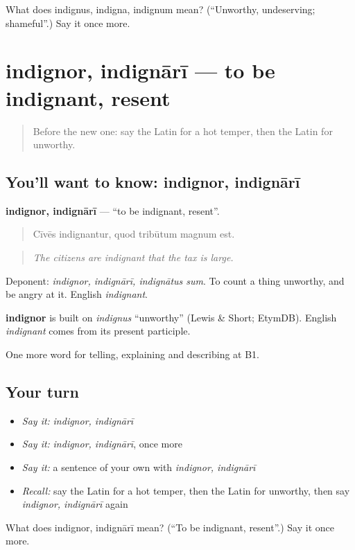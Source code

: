 \begin{tcolorbox}[breakable,colback=teal!4,colframe=teal!35!black,title={Before you move on}]
What does indignus, indigna, indignum mean? (\textquotedblleft{}Unworthy, undeserving; shameful\textquotedblright{}.) Say it once more.
\end{tcolorbox}
\section[indignor, indignārī]{indignor, indignārī — to be indignant, resent}

\label{lesson:LA-C493-indignor}



\begin{quote}
Before the new one: say the Latin for a hot temper, then the Latin for unworthy.
\end{quote}

\subsection*{You'll want to know: indignor, indignārī}
\textbf{indignor, indignārī} — \textquotedblleft{}to be indignant, resent\textquotedblright{}.

\begin{quote}
Cīvēs indignantur, quod tribūtum magnum est.
\end{quote}

\begin{quote}
\emph{The citizens are indignant that the tax is large.}
\end{quote}

Deponent: \emph{indignor, indignārī, indignātus sum}. To count a thing unworthy, and be angry at it. English \emph{indignant}.

\begin{cousinweb}
\textbf{indignor} is built on \emph{indignus} \textquotedblleft{}unworthy\textquotedblright{} (Lewis \& Short; EtymDB). English \emph{indignant} comes from its present participle.
\end{cousinweb}

\begin{grammarlens}[title={What you've built}]
One more word for telling, explaining and describing at B1.
\end{grammarlens}

\subsection*{Your turn}
\begin{itemize}
\raggedright
  \item \emph{Say it:} \emph{indignor, indignārī}
  \item \emph{Say it:} \emph{indignor, indignārī}, once more
  \item \emph{Say it:} a sentence of your own with \emph{indignor, indignārī}
  \item \emph{Recall:} say the Latin for a hot temper, then the Latin for unworthy, then say \emph{indignor, indignārī} again
\end{itemize}

\begin{tcolorbox}[breakable,colback=teal!4,colframe=teal!35!black,title={Before you move on}]
What does indignor, indignārī mean? (\textquotedblleft{}To be indignant, resent\textquotedblright{}.) Say it once more.
\end{tcolorbox}
